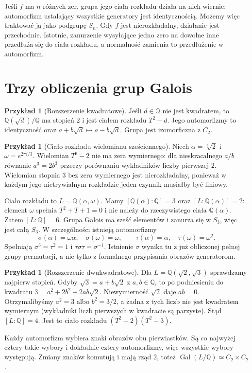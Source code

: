 \documentclass[11pt,a4paper,oneside]{book}
\numberwithin{equation}{section}
\theoremstyle{plain}
\theoremstyle{definition}
\newtheorem{przyklad}[twierdzenie]{Przykład}
\theoremstyle{remark}
\newcommand{\Q}{\mathbb{Q}}
\newcommand{\Gal}{\operatorname{Gal}}
\begin{document}
Jeśli $f$ ma $n$ różnych zer, grupa jego ciała rozkładu działa na nich wiernie: automorfizm ustalający wszystkie generatory jest identycznością. Możemy więc traktować ją jako podgrupę $S_n$. Gdy $f$ jest nierozkładalny, działanie jest przechodnie. Istotnie, zanurzenie wysyłające jedno zero na dowolne inne przedłuża się do ciała rozkładu, a normalność zamienia to przedłużenie w automorfizm.

\section{Trzy obliczenia grup Galois}

\begin{przyklad}[Rozszerzenie kwadratowe]
Jeśli $d\in\Q$ nie jest kwadratem, to $\Q(\sqrt d)/\Q$ ma stopień $2$ i jest ciałem rozkładu $T^2-d$. Jego automorfizmy to identyczność oraz $a+b\sqrt d\mapsto a-b\sqrt d$. Grupa jest izomorficzna z $C_2$.
\end{przyklad}

\begin{przyklad}[Ciało rozkładu wielomianu sześciennego]
Niech $\alpha=\sqrt[3]{2}$ i $\omega=e^{2\pi i/3}$. Wielomian $T^3-2$ nie ma zera wymiernego: dla nieskracalnego $a/b$ równanie $a^3=2b^3$ przeczy porównaniu wykładników liczby pierwszej $2$. Wielomian stopnia $3$ bez zera wymiernego jest nierozkładalny, ponieważ w każdym jego nietrywialnym rozkładzie jeden czynnik musiałby być liniowy.

Ciało rozkładu to $L=\Q(\alpha,\omega)$. Mamy $[\Q(\alpha):\Q]=3$ oraz $[L:\Q(\alpha)]=2$: element $\omega$ spełnia $T^2+T+1=0$ i nie należy do rzeczywistego ciała $\Q(\alpha)$. Zatem $[L:\Q]=6$. Grupa Galois ma sześć elementów i zanurza się w $S_3$, więc jest całą $S_3$. W szczególności istnieją automorfizmy
\[
\sigma(\alpha)=\omega\alpha,\quad\sigma(\omega)=\omega,
\qquad\tau(\alpha)=\alpha,\quad\tau(\omega)=\omega^2.
\]
Spełniają $\sigma^3=\tau^2=1$ i $\tau\sigma\tau=\sigma^{-1}$. Istnienie $\sigma$ wynika tu z już obliczonej pełnej grupy permutacji, a nie tylko z formalnego przypisania obrazów generatorom.
\end{przyklad}

\begin{przyklad}[Rozszerzenie dwukwadratowe]
Dla $L=\Q(\sqrt2,\sqrt3)$ sprawdzamy najpierw stopień. Gdyby $\sqrt3=a+b\sqrt2$ z $a,b\in\Q$, to po podniesieniu do kwadratu $3=a^2+2b^2+2ab\sqrt2$. Niewymierność $\sqrt2$ daje $ab=0$. Otrzymalibyśmy $a^2=3$ albo $b^2=3/2$, a żadna z tych liczb nie jest kwadratem wymiernym (wykładniki liczb pierwszych w kwadracie są parzyste). Stąd $[L:\Q]=4$. Jest to ciało rozkładu $(T^2-2)(T^2-3)$.

Każdy automorfizm wybiera znaki obrazów obu pierwiastków. Są co najwyżej cztery takie wybory i dokładnie cztery automorfizmy, więc wszystkie wybory występują. Zmiany znaków komutują i mają rząd $2$, toteż $\Gal(L/\Q)\simeq C_2\times C_2$.
\end{przyklad}
\end{document}
